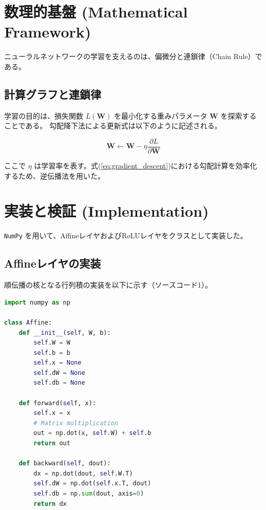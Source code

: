 \documentclass[uplatex, dvipdfmx, a4paper, 11pt]{jsarticle}
\begin{document}
\section{数理的基盤 (Mathematical Framework)}
ニューラルネットワークの学習を支えるのは、偏微分と連鎖律（Chain Rule）である。

\subsection{計算グラフと連鎖律}
学習の目的は、損失関数 $L(\bm{W})$ を最小化する重みパラメータ $\bm{W}$ を探索することである。
勾配降下法による更新式は以下のように記述される。

\begin{equation}
  \bm{W} \leftarrow \bm{W} - \eta \frac{\partial L}{\partial \bm{W}}
  \label{eq:gradient_descent}
\end{equation}

ここで $\eta$ は学習率を表す。式(\ref{eq:gradient_descent})における勾配計算を効率化するため、逆伝播法を用いた。

\section{実装と検証 (Implementation)}
\texttt{NumPy} を用いて、AffineレイヤおよびReLUレイヤをクラスとして実装した。

\subsection{Affineレイヤの実装}
順伝播の核となる行列積の実装を以下に示す（ソースコード1）。

\begin{lstlisting}[language=Python, caption=Affine Layer Implementation, label=code:affine]
import numpy as np

class Affine:
    def __init__(self, W, b):
        self.W = W
        self.b = b
        self.x = None
        self.dW = None
        self.db = None

    def forward(self, x):
        self.x = x
        # Matrix multiplication
        out = np.dot(x, self.W) + self.b 
        return out

    def backward(self, dout):
        dx = np.dot(dout, self.W.T)
        self.dW = np.dot(self.x.T, dout)
        self.db = np.sum(dout, axis=0)
        return dx
\end{lstlisting}
\end{document}
